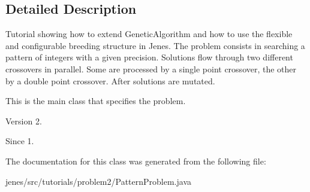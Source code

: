 \subsection{Detailed Description}
Tutorial showing how to extend {\ttfamily Genetic\-Algorithm} and how to use the flexible and configurable breeding structure in Jenes. The problem consists in searching a pattern of integers with a given precision. Solutions flow through two different crossovers in parallel. Some are processed by a single point crossover, the other by a double point crossover. After solutions are mutated.

This is the main class that specifies the problem.

\begin{DoxyVersion}{Version}
2. 
\end{DoxyVersion}
\begin{DoxySince}{Since}
1. 
\end{DoxySince}


The documentation for this class was generated from the following file\-:\begin{DoxyCompactItemize}
\item 
jenes/src/tutorials/problem2/Pattern\-Problem.\-java\end{DoxyCompactItemize}
